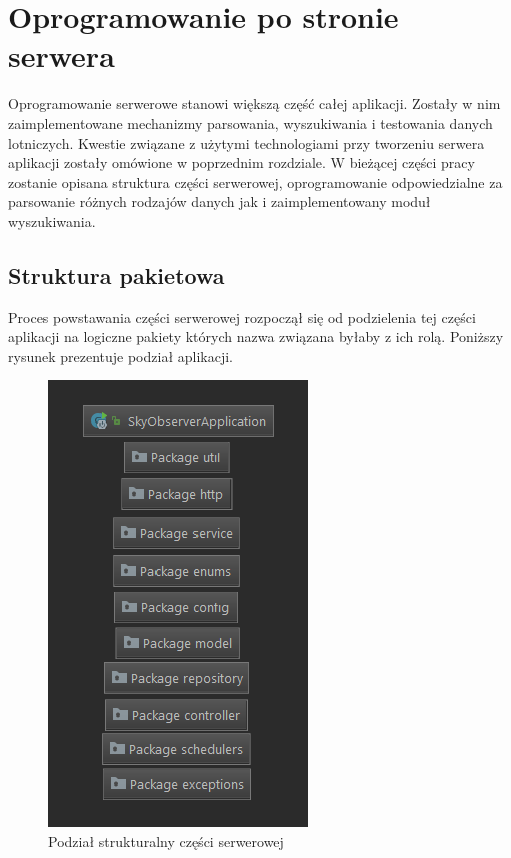 \documentclass[12pt, twoside]{report}
\begin{document}
\newpage
\section{Oprogramowanie po stronie serwera}
Oprogramowanie serwerowe stanowi większą część całej aplikacji. Zostały w nim zaimplementowane mechanizmy parsowania, wyszukiwania i testowania danych lotniczych. Kwestie związane z użytymi technologiami przy tworzeniu serwera aplikacji zostały omówione w poprzednim rozdziale. W bieżącej części pracy zostanie opisana struktura części serwerowej, oprogramowanie odpowiedzialne za parsowanie różnych rodzajów danych jak i zaimplementowany moduł wyszukiwania.
\subsection{Struktura pakietowa}
Proces powstawania części serwerowej rozpoczął się od podzielenia tej części aplikacji na logiczne pakiety których nazwa związana byłaby z ich rolą. Poniższy rysunek prezentuje podział aplikacji.

\begin{figure}[!ht]
\centering
\includegraphics[scale=0.90, keepaspectratio]{server_structure.png}
\caption{Podział strukturalny części serwerowej}
\label{fig:server_structure}
\end{figure}
\end{document}

